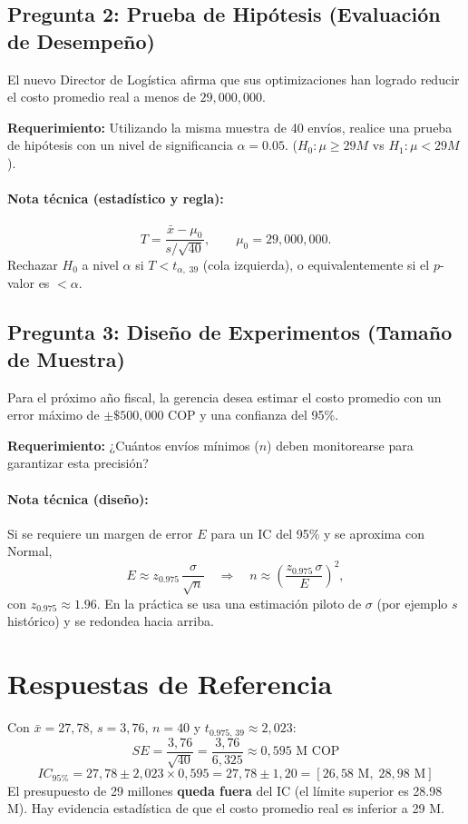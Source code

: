 \documentclass[11pt, letterpaper]{article}
\begin{document}
\subsection*{Pregunta 2: Prueba de Hipótesis (Evaluación de Desempeño)}
El nuevo Director de Logística afirma que sus optimizaciones han logrado reducir el costo promedio real a menos de $29{,}000{,}000$.

\textbf{Requerimiento:} Utilizando la misma muestra de 40 envíos, realice una prueba de hipótesis con un nivel de significancia $\alpha = 0.05$.
($H_0: \mu \ge 29M$ vs $H_1: \mu < 29M$).

\paragraph{Nota técnica (estadístico y regla):}
\[
T=\frac{\bar x-\mu_0}{s/\sqrt{40}},\qquad \mu_0=29{,}000{,}000.
\]
Rechazar $H_0$ a nivel $\alpha$ si $T < t_{\alpha,\;39}$ (cola izquierda), o equivalentemente si el $p$-valor es $<\alpha$.

\subsection*{Pregunta 3: Diseño de Experimentos (Tamaño de Muestra)}
Para el próximo año fiscal, la gerencia desea estimar el costo promedio con un error máximo de $\pm \$500{,}000$ COP y una confianza del 95\%.

\textbf{Requerimiento:} ¿Cuántos envíos mínimos ($n$) deben monitorearse para garantizar esta precisión?

\paragraph{Nota técnica (diseño):}
Si se requiere un margen de error $E$ para un IC del 95\% y se aproxima con Normal,
\[
E \approx z_{0.975}\,\frac{\sigma}{\sqrt{n}}
\quad\Rightarrow\quad
n \approx \left(\frac{z_{0.975}\,\sigma}{E}\right)^2,
\]
con $z_{0.975}\approx 1.96$. En la práctica se usa una estimación piloto de $\sigma$ (por ejemplo $s$ histórico) y se redondea hacia arriba.

\section{Respuestas de Referencia}

\begin{resultadobox}
Con $\bar{x} = 27{,}78$, $s = 3{,}76$, $n = 40$ y $t_{0.975,\,39} \approx 2{,}023$:
\[
SE = \frac{3{,}76}{\sqrt{40}} = \frac{3{,}76}{6{,}325} \approx 0{,}595 \text{ M COP}
\]
\[
IC_{95\%} = 27{,}78 \pm 2{,}023 \times 0{,}595 = 27{,}78 \pm 1{,}20 = [26{,}58\text{ M},\; 28{,}98\text{ M}]
\]
El presupuesto de 29 millones \textbf{queda fuera} del IC (el límite superior es 28.98 M). Hay evidencia estadística de que el costo promedio real es inferior a 29 M.
\end{resultadobox}
\end{document}
